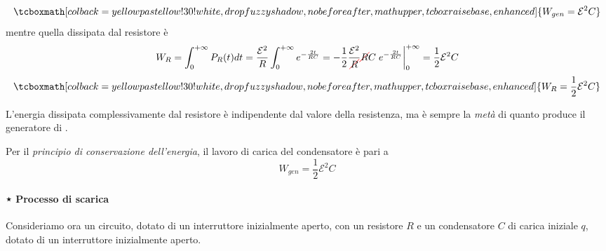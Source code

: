\begin{equation}
	\tcboxmath[colback=yellowpastellow!30!white,drop fuzzy shadow, nobeforeafter, math upper, tcbox raise base, enhanced]{W_{gen}=\mathcal{E}^2C}
\end{equation}
mentre quella dissipata dal resistore è
\begin{equation*}
	W_{R}=\int_{0}^{+\infty}P_{R}(t)dt=\frac{\mathcal{E}^2}{R}\int_{0}^{+\infty}e^{-\frac{2t}{RC}}=-\frac{1}{2}\frac{\mathcal{E}^2}{\Ccancel[red]{R}}\Ccancel[red]{R}C\eval{e^{-\frac{2t}{RC}}}_{0}^{+\infty}=\frac{1}{2}\mathcal{E}^2C
\end{equation*}
\begin{equation}
	\tcboxmath[colback=yellowpastellow!30!white,drop fuzzy shadow, nobeforeafter, math upper, tcbox raise base, enhanced]{W_{R}=\frac{1}{2}\mathcal{E}^2C}
\end{equation}
\begin{observe}
	L'energia dissipata complessivamente dal resistore è indipendente dal valore della resistenza, ma è sempre la \textit{metà} di quanto produce il generatore di \fem.
\end{observe}
Per il \textit{principio di conservazione dell'energia}, il lavoro di carica del condensatore è pari a 
\begin{equation}
	W_{gen}=\frac{1}{2}\mathcal{E}^2C
\end{equation}
\paragraph{⋆ Processo di scarica}
Consideriamo ora un circuito, dotato di un interruttore inizialmente aperto, con un resistore $R$ e un condensatore $C$ di carica iniziale $q$, dotato di un interruttore inizialmente aperto.

